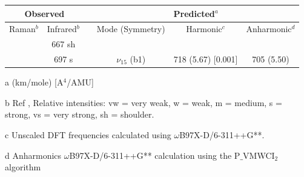  
 
 \begin{table}[H]
 	\begin{center}
 		\begin{threeparttable}
 			\begin{tabular}{c c c c c c}
 				\hline
 				\multicolumn{ 2}{c}{Observed} & \multicolumn{1}{c}{} & \multicolumn{ 3}{c}{Predicted$^{a}$} \\ \hline
 				Raman$^{b}$ & \multicolumn{1}{c}{Infrared$^{b}$} &  & \multicolumn{1}{c}{Mode (Symmetry)} & \multicolumn{1}{c}{Harmonic$^{c}$} & Anharmonic$^{d}$ \\ \hline
 & 667 sh &  &  &  &  \\ 
 & 697 s &  & \multicolumn{1}{c}{$\nu_{15}$ (b1)} & 718 (5.67) [0.001] & 705 (5.50) \\ 
 \bottomrule
	\end{tabular}
	
	\begin{tablenotes}
		\item[a] (km/mole) [A$^{4}$/AMU]
		\item[b] Ref \cite{michaelian2014raman}, Relative intensities: vw = very weak, w = weak, m = medium, s = strong, vs = very strong, sh = shoulder.
		\item[c] Unscaled DFT frequencies calculated using $\omega$B97X-D/6-311++G**.
		\item[d] Anharmonics $\omega$B97X-D/6-311++G** calculation using the P$\_$VMWCI$_{2}$ algorithm
	\end{tablenotes}
\end{threeparttable}
\end{center}
\label{lowfreq-Fluorene}
\end{table}




